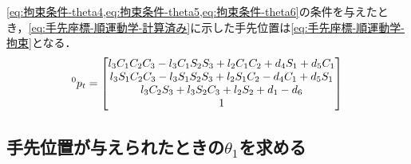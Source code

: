 \documentclass{ltjsarticle}
\begin{document}
\cref{eq:拘束条件-theta4,eq:拘束条件-theta5,eq:拘束条件-theta6}の条件を与えたとき，\cref{eq:手先座標-順運動学-計算済み}に示した手先位置は\cref{eq:手先座標-順運動学-拘束}となる．
\begin{align}
	\label{eq:手先座標-順運動学-拘束}
	^0p_t = \mqty[
		l_3C_1C_2C_3 - l_3C_1S_2S_3 + l_2C_1C_2 + d_4S_1 + d_5C_1 \\
		l_3S_1C_2C_3 - l_3S_1S_2S_3 + l_2S_1C_2 - d_4C_1 + d_5S_1 \\
		l_3C_2S_3 + l_3S_2C_3 + l_2S_2 + d_1 - d_6 \\
		1
	]
\end{align}

\subsection{手先位置が与えられたときの$\theta_1$を求める}\label{subsec:手先位置が与えられたときのtheta1を求める}
\end{document}
